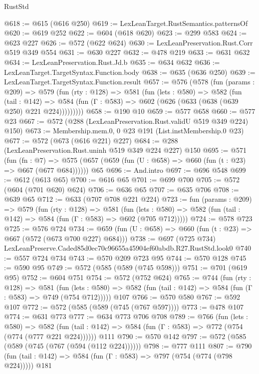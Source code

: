 \begin{lexlean}{RustStd}
\begin{coremodule}
@618 := @615 (@616 @250)
@619 := LexLeanTarget.RustSemantics.patternsOf
@620 := @619 @252
@622 := @604 (@618 @620)
@623 := @299 @583
@624 := @623 @227
@626 := @572 (@622 @624)
@630 := LexLeanPreservation.Rust.Corr @519 @349 @554
@631 := @630 @227
@632 := @478 @219
@633 := @631 @632
@634 := LexLeanPreservation.Rust.Jd.b
@635 := @634 @632
@636 := LexLeanTarget.TargetSyntax.Function.body
@638 := @635 (@636 @250)
@639 := LexLeanTarget.TargetSyntax.Function.result
@657 := @576
    (@578
      (fun (params : @209) =>
      @579
        (fun (rty : @128) =>
        @581
          (fun (lets : @580) =>
          @582
            (fun (tail : @142) =>
            @584 (fun (Γ : @583) => @602 (@626 (@633 (@638 (@639 @250) @221 @224)))))))))
@658 := @190 @10
@659 := @577 @658
@660 := @577 @23
@667 := @572 (@288 (LexLeanPreservation.Rust.validU @519 @349 @224) @150)
@673 := Membership.mem.{0, 0} @23 @191 (List.instMembership.{0} @23)
@677 := @572 (@673 (@616 @221) @227)
@684 := @288 (LexLeanPreservation.Rust.uninh @519 @349 @224 @227) @150
@695 := @571
    (fun (fn : @7) =>
    @575 (@657 (@659 (fun (U : @658) => @660 (fun (t : @23) => @667 (@677 @684))))))
    @65
@696 := And.intro
@697 := @696 @548
@699 := @612 (@613 @65)
@700 := @616 @65
@701 := @699 @700
@705 := @572 (@604 (@701 @620) @624)
@706 := @636 @65
@707 := @635 @706
@708 := @639 @65
@712 := @633 (@707 @708 @221 @224)
@723 := fun (params : @209) =>
  @579
    (fun (rty : @128) =>
    @581
      (fun (lets : @580) => @582 (fun (tail : @142) => @584 (fun (Γ : @583) => @602 (@705 @712)))))
@724 := @578 @723
@725 := @576 @724
@734 := @659 (fun (U : @658) => @660 (fun (t : @23) => @667 (@572 (@673 @700 @227) @684)))
@738 := @697 (@725 @734) LexLeanPreserve.Caded85d0ec70c96655a45904ef60abdb.R27.RustStd.look0
@740 := @557 @724 @734
@743 := @570 @209 @723 @95
@744 := @570 @128
@745 := @590 @95
@749 := @572 (@585 (@589 (@745 @598)))
@751 := @701 (@619 @95)
@752 := @604 @751
@754 := @572 (@752 @624)
@765 := @744
    (fun (rty : @128) =>
    @581
      (fun (lets : @580) => @582 (fun (tail : @142) => @584 (fun (Γ : @583) => @749 (@754 @712)))))
    @107
@766 := @570 @580
@767 := @592 @107
@772 := @572 (@585 (@589 (@745 (@767 @597))))
@773 := @478 @107
@774 := @631 @773
@777 := @634 @773 @706 @708
@789 := @766
    (fun (lets : @580) =>
    @582 (fun (tail : @142) => @584 (fun (Γ : @583) => @772 (@754 (@774 (@777 @221 @224))))))
    @111
@790 := @570 @142
@797 := @572 (@585 (@589 (@745 (@767 (@594 (@112 @224))))))
@798 := @777 @111
@807 := @790 (fun (tail : @142) => @584 (fun (Γ : @583) => @797 (@754 (@774 (@798 @224))))) @181

\end{coremodule}
\end{lexlean}
